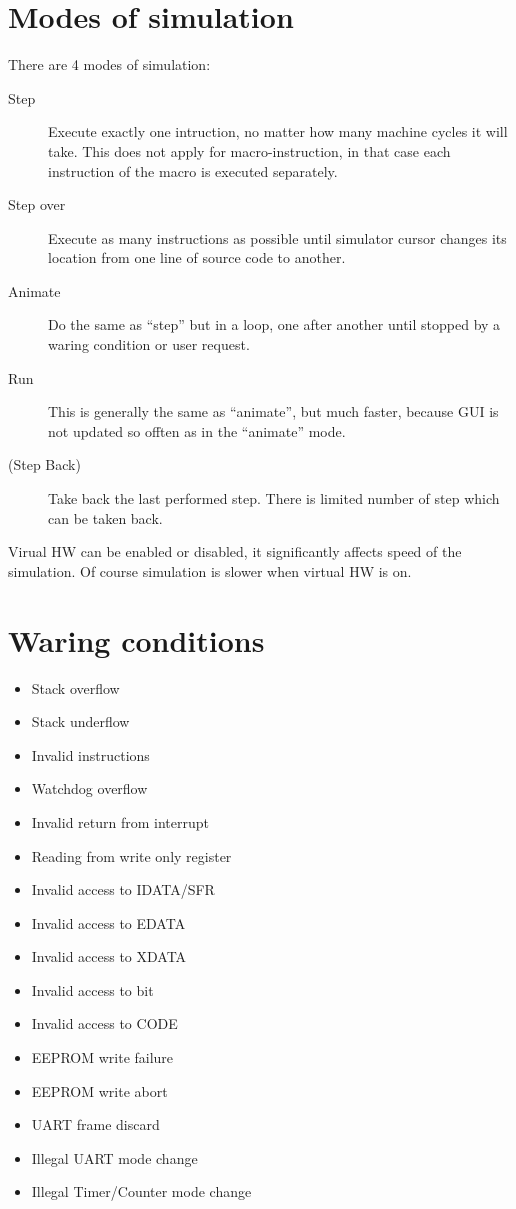 \documentclass[a4paper,twoside,12pt]{book}
\begin{document}
	\section{Modes of simulation}
		There are 4 modes of simulation:
		\begin{description}
			\item[Step]
				Execute exactly one intruction, no matter how many machine cycles it will take. This does not apply for macro-instruction, in that case each instruction of the macro is executed separately.
			\item[Step over]
				Execute as many instructions as possible until simulator cursor changes its location from one line of source code to another.
			\item[Animate]
				Do the same as ``step'' but in a loop, one after another until stopped by a waring condition or user request.
			\item[Run]
				This is generally the same as ``animate'', but much faster, because GUI is not updated so offten as in the ``animate'' mode.
			\item[(Step Back)]
				Take back the last performed step. There is limited number of step which can be taken back.
		\end{description}

		Virual HW can be enabled or disabled, it significantly affects speed of the simulation. Of course simulation is slower when virtual HW is on.

	\section{Waring conditions}
		\begin{itemize}
			\setlength{\itemsep}{-3pt}
			\item Stack overflow
			\item Stack underflow
			\item Invalid instructions
			\item Watchdog overflow
			\item Invalid return from interrupt
			\item Reading from write only register
			\item Invalid access to IDATA/SFR
			\item Invalid access to EDATA
			\item Invalid access to XDATA
			\item Invalid access to bit
			\item Invalid access to CODE
			\item EEPROM write failure
			\item EEPROM write abort
			\item UART frame discard
			\item Illegal UART mode change
			\item Illegal Timer/Counter mode change
		\end{itemize}
\end{document}
